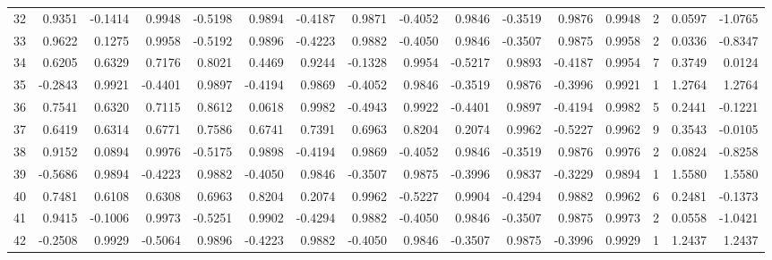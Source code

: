 \begin{tabular}{lrrrrrrrrrrrrrrr}
32  &      0.9351 & -0.1414 &  0.9948 & -0.5198 &  0.9894 & -0.4187 &  0.9871 & -0.4052 &  0.9846 & -0.3519 &   0.9876 &     0.9948 &      2 &                    0.0597 &                    -1.0765 \\
33  &      0.9622 &  0.1275 &  0.9958 & -0.5192 &  0.9896 & -0.4223 &  0.9882 & -0.4050 &  0.9846 & -0.3507 &   0.9875 &     0.9958 &      2 &                    0.0336 &                    -0.8347 \\
34  &      0.6205 &  0.6329 &  0.7176 &  0.8021 &  0.4469 &  0.9244 & -0.1328 &  0.9954 & -0.5217 &  0.9893 &  -0.4187 &     0.9954 &      7 &                    0.3749 &                     0.0124 \\
35  &     -0.2843 &  0.9921 & -0.4401 &  0.9897 & -0.4194 &  0.9869 & -0.4052 &  0.9846 & -0.3519 &  0.9876 &  -0.3996 &     0.9921 &      1 &                    1.2764 &                     1.2764 \\
36  &      0.7541 &  0.6320 &  0.7115 &  0.8612 &  0.0618 &  0.9982 & -0.4943 &  0.9922 & -0.4401 &  0.9897 &  -0.4194 &     0.9982 &      5 &                    0.2441 &                    -0.1221 \\
37  &      0.6419 &  0.6314 &  0.6771 &  0.7586 &  0.6741 &  0.7391 &  0.6963 &  0.8204 &  0.2074 &  0.9962 &  -0.5227 &     0.9962 &      9 &                    0.3543 &                    -0.0105 \\
38  &      0.9152 &  0.0894 &  0.9976 & -0.5175 &  0.9898 & -0.4194 &  0.9869 & -0.4052 &  0.9846 & -0.3519 &   0.9876 &     0.9976 &      2 &                    0.0824 &                    -0.8258 \\
39  &     -0.5686 &  0.9894 & -0.4223 &  0.9882 & -0.4050 &  0.9846 & -0.3507 &  0.9875 & -0.3996 &  0.9837 &  -0.3229 &     0.9894 &      1 &                    1.5580 &                     1.5580 \\
40  &      0.7481 &  0.6108 &  0.6308 &  0.6963 &  0.8204 &  0.2074 &  0.9962 & -0.5227 &  0.9904 & -0.4294 &   0.9882 &     0.9962 &      6 &                    0.2481 &                    -0.1373 \\
41  &      0.9415 & -0.1006 &  0.9973 & -0.5251 &  0.9902 & -0.4294 &  0.9882 & -0.4050 &  0.9846 & -0.3507 &   0.9875 &     0.9973 &      2 &                    0.0558 &                    -1.0421 \\
42  &     -0.2508 &  0.9929 & -0.5064 &  0.9896 & -0.4223 &  0.9882 & -0.4050 &  0.9846 & -0.3507 &  0.9875 &  -0.3996 &     0.9929 &      1 &                    1.2437 &                     1.2437 \\

\end{tabular}

